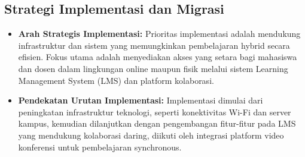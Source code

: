 \subsection{Strategi Implementasi dan Migrasi}
\begin{itemize}
	\item \textbf{Arah Strategis Implementasi:} 
	Prioritas implementasi adalah mendukung infrastruktur dan sistem yang memungkinkan pembelajaran hybrid secara efisien. Fokus utama adalah menyediakan akses yang setara bagi mahasiswa dan dosen dalam lingkungan online maupun fisik melalui sistem Learning Management System (LMS) dan platform kolaborasi.
	
	\item \textbf{Pendekatan Urutan Implementasi:} 
	Implementasi dimulai dari peningkatan infrastruktur teknologi, seperti konektivitas Wi-Fi dan server kampus, kemudian dilanjutkan dengan pengembangan fitur-fitur pada LMS yang mendukung kolaborasi daring, diikuti oleh integrasi platform video konferensi untuk pembelajaran synchronous.
\end{itemize}


